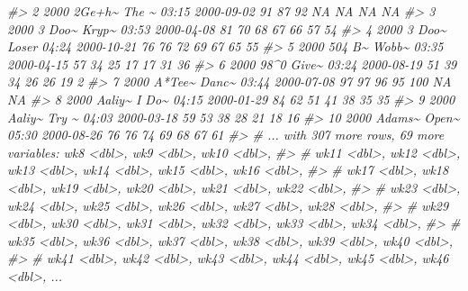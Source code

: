 \documentclass[
]{book}
\newenvironment{Shaded}{\begin{snugshade}}{\end{snugshade}}
\newcommand{\CommentTok}[1]{\textcolor[rgb]{0.56,0.35,0.01}{\textit{#1}}}
\begin{document}
\begin{Shaded}
\begin{Highlighting}[]
\CommentTok{\#\textgreater{}  2  2000 2Ge+h\textasciitilde{} The \textasciitilde{} 03:15 2000{-}09{-}02    91    87    92    NA    NA    NA    NA}
\CommentTok{\#\textgreater{}  3  2000 3 Doo\textasciitilde{} Kryp\textasciitilde{} 03:53 2000{-}04{-}08    81    70    68    67    66    57    54}
\CommentTok{\#\textgreater{}  4  2000 3 Doo\textasciitilde{} Loser 04:24 2000{-}10{-}21    76    76    72    69    67    65    55}
\CommentTok{\#\textgreater{}  5  2000 504 B\textasciitilde{} Wobb\textasciitilde{} 03:35 2000{-}04{-}15    57    34    25    17    17    31    36}
\CommentTok{\#\textgreater{}  6  2000 98\^{}0   Give\textasciitilde{} 03:24 2000{-}08{-}19    51    39    34    26    26    19     2}
\CommentTok{\#\textgreater{}  7  2000 A*Tee\textasciitilde{} Danc\textasciitilde{} 03:44 2000{-}07{-}08    97    97    96    95   100    NA    NA}
\CommentTok{\#\textgreater{}  8  2000 Aaliy\textasciitilde{} I Do\textasciitilde{} 04:15 2000{-}01{-}29    84    62    51    41    38    35    35}
\CommentTok{\#\textgreater{}  9  2000 Aaliy\textasciitilde{} Try \textasciitilde{} 04:03 2000{-}03{-}18    59    53    38    28    21    18    16}
\CommentTok{\#\textgreater{} 10  2000 Adams\textasciitilde{} Open\textasciitilde{} 05:30 2000{-}08{-}26    76    76    74    69    68    67    61}
\CommentTok{\#\textgreater{} \# ... with 307 more rows, 69 more variables: wk8 \textless{}dbl\textgreater{}, wk9 \textless{}dbl\textgreater{}, wk10 \textless{}dbl\textgreater{},}
\CommentTok{\#\textgreater{} \#   wk11 \textless{}dbl\textgreater{}, wk12 \textless{}dbl\textgreater{}, wk13 \textless{}dbl\textgreater{}, wk14 \textless{}dbl\textgreater{}, wk15 \textless{}dbl\textgreater{}, wk16 \textless{}dbl\textgreater{},}
\CommentTok{\#\textgreater{} \#   wk17 \textless{}dbl\textgreater{}, wk18 \textless{}dbl\textgreater{}, wk19 \textless{}dbl\textgreater{}, wk20 \textless{}dbl\textgreater{}, wk21 \textless{}dbl\textgreater{}, wk22 \textless{}dbl\textgreater{},}
\CommentTok{\#\textgreater{} \#   wk23 \textless{}dbl\textgreater{}, wk24 \textless{}dbl\textgreater{}, wk25 \textless{}dbl\textgreater{}, wk26 \textless{}dbl\textgreater{}, wk27 \textless{}dbl\textgreater{}, wk28 \textless{}dbl\textgreater{},}
\CommentTok{\#\textgreater{} \#   wk29 \textless{}dbl\textgreater{}, wk30 \textless{}dbl\textgreater{}, wk31 \textless{}dbl\textgreater{}, wk32 \textless{}dbl\textgreater{}, wk33 \textless{}dbl\textgreater{}, wk34 \textless{}dbl\textgreater{},}
\CommentTok{\#\textgreater{} \#   wk35 \textless{}dbl\textgreater{}, wk36 \textless{}dbl\textgreater{}, wk37 \textless{}dbl\textgreater{}, wk38 \textless{}dbl\textgreater{}, wk39 \textless{}dbl\textgreater{}, wk40 \textless{}dbl\textgreater{},}
\CommentTok{\#\textgreater{} \#   wk41 \textless{}dbl\textgreater{}, wk42 \textless{}dbl\textgreater{}, wk43 \textless{}dbl\textgreater{}, wk44 \textless{}dbl\textgreater{}, wk45 \textless{}dbl\textgreater{}, wk46 \textless{}dbl\textgreater{}, ...}
\end{Highlighting}
\end{Shaded}
\end{document}
